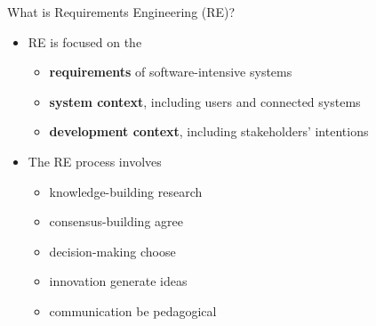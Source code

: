 

\begin{Slide}{What is Requirements Engineering (RE)?}

\begin{itemize}
\item RE is focused on the
\begin{itemize}
\item \textbf{requirements} of software-intensive systems 
\item \textbf{system context}, including users and connected systems
\item \textbf{development context}, including stakeholders' intentions 

\end{itemize}
\item The RE process involves 
\begin{itemize}
\item knowledge-building \hfill research
\item consensus-building \hfill agree
\item decision-making    \hfill choose
\item innovation         \hfill generate ideas
\item communication      \hfill be pedagogical

\end{itemize}
\end{itemize}
\end{Slide}